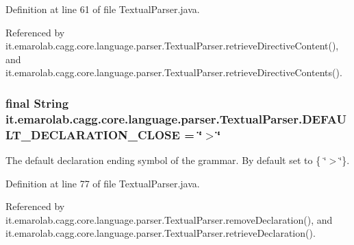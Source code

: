Definition at line 61 of file Textual\-Parser.\-java.



Referenced by it.\-emarolab.\-cagg.\-core.\-language.\-parser.\-Textual\-Parser.\-retrieve\-Directive\-Content(), and it.\-emarolab.\-cagg.\-core.\-language.\-parser.\-Textual\-Parser.\-retrieve\-Directive\-Contents().

\hypertarget{classit_1_1emarolab_1_1cagg_1_1core_1_1language_1_1parser_1_1TextualParser_ad3397a80478c23fe4bcd487e6ffd6c0d}{
\subsubsection[{D\-E\-F\-A\-U\-L\-T\-\_\-\-D\-E\-C\-L\-A\-R\-A\-T\-I\-O\-N\-\_\-\-C\-L\-O\-S\-E}]{\setlength{\rightskip}{0pt plus 5cm}final String it.\-emarolab.\-cagg.\-core.\-language.\-parser.\-Textual\-Parser.\-D\-E\-F\-A\-U\-L\-T\-\_\-\-D\-E\-C\-L\-A\-R\-A\-T\-I\-O\-N\-\_\-\-C\-L\-O\-S\-E = \char`\"{}$>$\char`\"{}\hspace{0.3cm}{\ttfamily [static]}}}\label{classit_1_1emarolab_1_1cagg_1_1core_1_1language_1_1parser_1_1TextualParser_ad3397a80478c23fe4bcd487e6ffd6c0d}
The default declaration ending symbol of the grammar. By default set to \{ \char`\"{}$>$\char`\"{}\}. 

Definition at line 77 of file Textual\-Parser.\-java.



Referenced by it.\-emarolab.\-cagg.\-core.\-language.\-parser.\-Textual\-Parser.\-remove\-Declaration(), and it.\-emarolab.\-cagg.\-core.\-language.\-parser.\-Textual\-Parser.\-retrieve\-Declaration().

